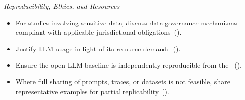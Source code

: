 \noindent\textit{Reproducibility, Ethics, and Resources}
\begin{itemize}[label={},leftmargin=*]
    \item \iconM {} For studies involving sensitive data, discuss data governance mechanisms compliant with applicable jurisdictional obligations~().
    \item \iconS Justify LLM usage in light of its resource demands~().
    \item \iconS Ensure the open-LLM baseline is independently reproducible from the \supplementarymaterial~().
    \item \iconS {} Where full sharing of prompts, traces, or datasets is not feasible, share representative examples for partial replicability~().
\end{itemize}

